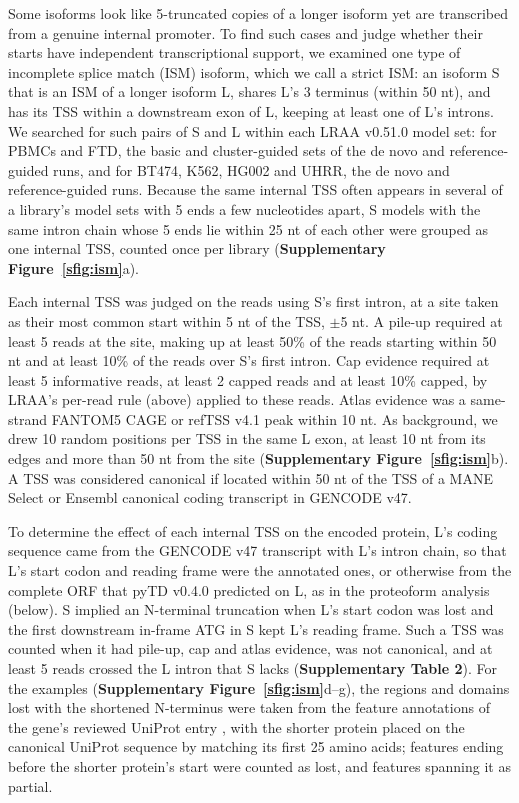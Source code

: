 Some isoforms look like 5\p{}-truncated copies of a longer isoform yet are transcribed from a genuine internal promoter. To find such cases and judge whether their starts have independent transcriptional support, we examined one type of incomplete splice match (ISM) isoform, which we call a strict ISM: an isoform S that is an ISM of a longer isoform L, shares L's 3\p{} terminus (within 50 nt), and has its TSS within a downstream exon of L, keeping at least one of L's introns. We searched for such pairs of S and L within each LRAA v0.51.0 model set: for PBMCs and FTD, the basic and cluster-guided sets of the de novo and reference-guided runs, and for BT474, K562, HG002 and UHRR, the de novo and reference-guided runs. Because the same internal TSS often appears in several of a library's model sets with 5\p{} ends a few nucleotides apart, S models with the same intron chain whose 5\p{} ends lie within 25 nt of each other were grouped as one internal TSS, counted once per library (\textbf{Supplementary Figure~\ref{sfig:ism}}a).

Each internal TSS was judged on the reads using S's first intron, at a site taken as their most common start within 5 nt of the TSS, $\pm$5 nt. A pile-up required at least 5 reads at the site, making up at least 50\% of the reads starting within 50 nt and at least 10\% of the reads over S's first intron. Cap evidence required at least 5 informative reads, at least 2 capped reads and at least 10\% capped, by LRAA's per-read rule (above) applied to these reads. Atlas evidence was a same-strand FANTOM5 CAGE \citep{forrest2014} or refTSS v4.1 \citep{abugessaisa2019} peak within 10 nt. As background, we drew 10 random positions per TSS in the same L exon, at least 10 nt from its edges and more than 50 nt from the site (\textbf{Supplementary Figure~\ref{sfig:ism}}b). A TSS was considered canonical if located within 50 nt of the TSS of a MANE Select or Ensembl canonical coding transcript in GENCODE v47.

To determine the effect of each internal TSS on the encoded protein, L's coding sequence came from the GENCODE v47 transcript with L's intron chain, so that L's start codon and reading frame were the annotated ones, or otherwise from the complete ORF that pyTD v0.4.0 \citep{pytransdecoder} predicted on L, as in the proteoform analysis (below). S implied an N-terminal truncation when L's start codon was lost and the first downstream in-frame ATG in S kept L's reading frame. Such a TSS was counted when it had pile-up, cap and atlas evidence, was not canonical, and at least 5 reads crossed the L intron that S lacks (\textbf{Supplementary Table 2}). For the examples (\textbf{Supplementary Figure~\ref{sfig:ism}}d--g), the regions and domains lost with the shortened N-terminus were taken from the feature annotations of the gene's reviewed UniProt entry \citep{uniprot2025}, with the shorter protein placed on the canonical UniProt sequence by matching its first 25 amino acids; features ending before the shorter protein's start were counted as lost, and features spanning it as partial.

